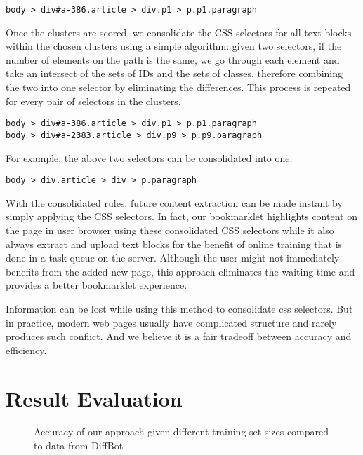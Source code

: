 \documentclass{acm_proc_article-sp}
\begin{document}
\begin{verbatim}
body > div#a-386.article > div.p1 > p.p1.paragraph
\end{verbatim}

Once the clusters are scored, we consolidate the CSS selectors for all text blocks within the chosen clusters using a simple algorithm: given two selectors, if the number of elements on the path is the same, we go through each element and take an intersect of the sets of IDs and the sets of classes, therefore combining the two into one selector by eliminating the differences. This process is repeated for every pair of selectors in the clusters.

\begin{verbatim}
body > div#a-386.article > div.p1 > p.p1.paragraph
body > div#a-2383.article > div.p9 > p.p9.paragraph
\end{verbatim}

For example, the above two selectors can be consolidated into one:

\begin{verbatim}
body > div.article > div > p.paragraph
\end{verbatim}

With the consolidated rules, future content extraction can be made instant by simply applying the CSS selectors. In fact, our bookmarklet highlights content on the page in user browser using these consolidated CSS selectors while it also always extract and upload text blocks for the benefit of online training that is done in a task queue on the server. Although the user might not immediately benefits from the added new page, this approach eliminates the waiting time and provides a better bookmarklet experience.

Information can be lost while using this method to consolidate css selectors. But in practice, modern web pages usually have complicated structure and rarely produces such conflict. And we believe it is a fair tradeoff between accuracy and efficiency.

\section{Result Evaluation}

\begin{figure*}
\centering
{}
\caption{Accuracy of our approach given different training set sizes compared to data from DiffBot}
\end{figure*}
\end{document}
